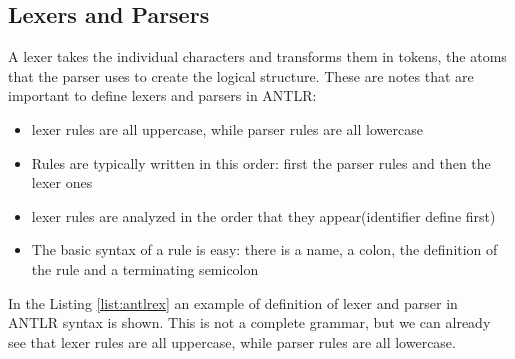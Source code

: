 \subsection{Lexers and Parsers}
A lexer takes the individual characters and 
transforms them in tokens, the atoms that the 
parser uses to create the logical structure.
These are notes that are important to define lexers
and parsers in ANTLR:

\begin{itemize}
    \item  lexer rules are all uppercase, while 
    parser rules are all lowercase
    \item  Rules are typically written in this 
    order: first the parser rules and then the lexer ones
    \item  lexer rules are analyzed in the order 
    that they appear(identifier define first)
    \item  The basic syntax of a rule is easy: 
    there is a name, a colon, the definition 
    of the rule and a terminating semicolon

\end{itemize}

In the Listing \ref{list:antlrex} an example of definition
 of lexer and parser in ANTLR syntax is shown.
This is not a complete grammar, but we can already 
see that lexer rules are all uppercase, while 
parser rules are all lowercase.
